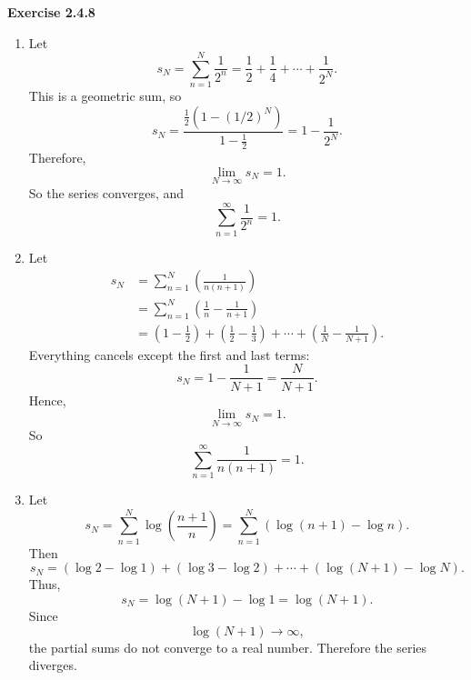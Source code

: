 \documentclass[12pt]{article}
\begin{document}
\noindent{} \textbf{Exercise 2.4.8}
\begin{enumerate}
    \item [(a)] Let
          \[
              s_N=\sum_{n=1}^N\frac1{2^n}
              =\frac12+\frac14+\cdots+\frac1{2^N}.
          \]This is a geometric sum, so
          \[
              s_N=\frac{\frac12(1-(1/2)^N)}{1-\frac12}
              =1-\frac1{2^N}.
          \]Therefore,
          \[
              \lim_{N\to\infty}s_N=1.
          \]So the series converges, and
          \[
              \sum_{n=1}^{\infty}\frac1{2^n}=1.
          \]
    \item [(b)] Let
          \[
              \begin{aligned}
                  s_N
                   & = \sum_{n=1}^N\left(\frac{1}{n(n+1)}\right)             \\
                   & = \sum_{n=1}^N\left(\frac1n-\frac1{n+1}\right)          \\
                   & = \left(1-\frac12\right) + \left(\frac12-\frac13\right)
                  + \cdots + \left(\frac1N-\frac1{N+1}\right).
              \end{aligned}
          \]
          Everything cancels except the first and last terms:
          \[
              s_N=1-\frac1{N+1}=\frac{N}{N+1}.
          \]Hence,
          \[
              \lim_{N\to\infty}s_N=1.
          \]So
          \[
              \sum_{n=1}^{\infty}\frac1{n(n+1)}=1.
          \]
    \item [(c)]
          Let \[
              s_N
              =
              \sum_{n=1}^N \log\left(\frac{n+1}{n}\right)
              =
              \sum_{n=1}^N\left(\log(n+1)-\log n\right).
          \]
          Then
          \[
              s_N
              =
              (\log2-\log1)+(\log3-\log2)+\cdots+(\log(N+1)-\log N).
          \]
          Thus,
          \[
              s_N=\log(N+1)-\log1=\log(N+1).
          \]
          Since
          \[
              \log(N+1)\to\infty,
          \]the partial sums do not converge to a real number. Therefore the series diverges.
\end{enumerate}
\end{document}
